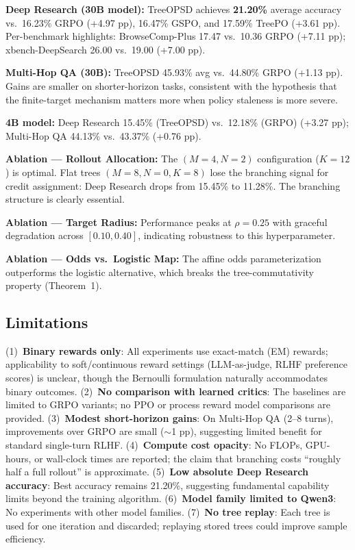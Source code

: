 \documentclass[11pt,a4paper]{article}
\begin{document}
\textbf{Deep Research (30B model):} TreeOPSD achieves \textbf{21.20\%} average accuracy vs.\ 16.23\% GRPO (+4.97 pp), 16.47\% GSPO, and 17.59\% TreePO (+3.61 pp). Per-benchmark highlights: BrowseComp-Plus 17.47 vs.\ 10.36 GRPO (+7.11 pp); xbench-DeepSearch 26.00 vs.\ 19.00 (+7.00 pp).

\textbf{Multi-Hop QA (30B):} TreeOPSD 45.93\% avg vs.\ 44.80\% GRPO (+1.13 pp). Gains are smaller on shorter-horizon tasks, consistent with the hypothesis that the finite-target mechanism matters more when policy staleness is more severe.

\textbf{4B model:} Deep Research 15.45\% (TreeOPSD) vs.\ 12.18\% (GRPO) (+3.27 pp); Multi-Hop QA 44.13\% vs.\ 43.37\% (+0.76 pp).

\textbf{Ablation --- Rollout Allocation:} The $(M{=}4, N{=}2)$ configuration ($K{=}12$) is optimal. Flat trees $(M{=}8, N{=}0, K{=}8)$ lose the branching signal for credit assignment: Deep Research drops from 15.45\% to 11.28\%. The branching structure is clearly essential.

\textbf{Ablation --- Target Radius:} Performance peaks at $\rho{=}0.25$ with graceful degradation across $[0.10, 0.40]$, indicating robustness to this hyperparameter.

\textbf{Ablation --- Odds vs.\ Logistic Map:} The affine odds parameterization outperforms the logistic alternative, which breaks the tree-commutativity property (Theorem~1).

\subsection{Limitations}
(1)~\textbf{Binary rewards only}: All experiments use exact-match (EM) rewards; applicability to soft/continuous reward settings (LLM-as-judge, RLHF preference scores) is unclear, though the Bernoulli formulation naturally accommodates binary outcomes. (2)~\textbf{No comparison with learned critics}: The baselines are limited to GRPO variants; no PPO or process reward model comparisons are provided. (3)~\textbf{Modest short-horizon gains}: On Multi-Hop QA (2--8 turns), improvements over GRPO are small ($\sim$1 pp), suggesting limited benefit for standard single-turn RLHF. (4)~\textbf{Compute cost opacity}: No FLOPs, GPU-hours, or wall-clock times are reported; the claim that branching costs ``roughly half a full rollout'' is approximate. (5)~\textbf{Low absolute Deep Research accuracy}: Best accuracy remains 21.20\%, suggesting fundamental capability limits beyond the training algorithm. (6)~\textbf{Model family limited to Qwen3}: No experiments with other model families. (7)~\textbf{No tree replay}: Each tree is used for one iteration and discarded; replaying stored trees could improve sample efficiency.
\end{document}
